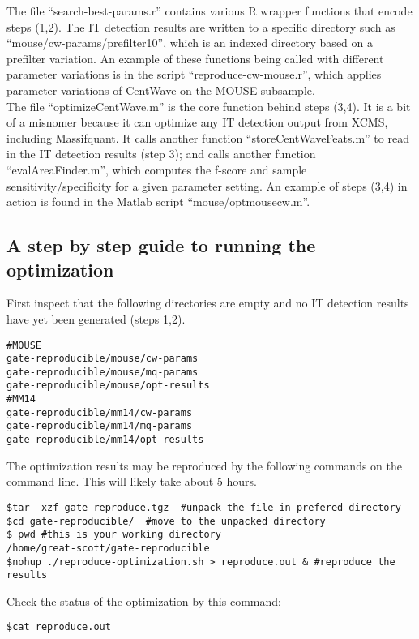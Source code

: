 \documentclass[11pt]{amsart}
\begin{document}
The file ``search-best-params.r'' contains various R wrapper functions that encode steps (1,2). The IT detection results are written to a specific directory such as ``mouse/cw-params/prefilter10'', which is an indexed directory based on a prefilter variation.  An example of these functions being called with different parameter variations is in the script ``reproduce-cw-mouse.r'', which applies parameter variations of  CentWave on the MOUSE subsample. \\

 The file ``optimizeCentWave.m'' is the core function behind steps (3,4). It is a bit of a misnomer because it can optimize any IT detection output from XCMS, including  Massifquant. It calls another function ``storeCentWaveFeats.m''  to read in the IT detection results (step 3); and calls another function ``evalAreaFinder.m'', which computes the f-score and sample sensitivity/specificity for a given parameter setting.   An example of steps (3,4) in action is found in the Matlab script ``mouse/optmousecw.m''. 

\subsection{A step by step guide to running the optimization}

First inspect that the following directories are empty and no IT detection results have yet been generated (steps 1,2). 
\begin{verbatim}
#MOUSE
gate-reproducible/mouse/cw-params
gate-reproducible/mouse/mq-params
gate-reproducible/mouse/opt-results
#MM14
gate-reproducible/mm14/cw-params
gate-reproducible/mm14/mq-params
gate-reproducible/mm14/opt-results

\end{verbatim}

The optimization results may be reproduced by the following commands on the command line.  This  will likely take about 5 hours. 

\begin{verbatim}
$tar -xzf gate-reproduce.tgz  #unpack the file in prefered directory
$cd gate-reproducible/  #move to the unpacked directory
$ pwd #this is your working directory
/home/great-scott/gate-reproducible
$nohup ./reproduce-optimization.sh > reproduce.out & #reproduce the results
\end{verbatim}

Check the status of the optimization by this command:
\begin{verbatim}
$cat reproduce.out
\end{verbatim}
\end{document}
